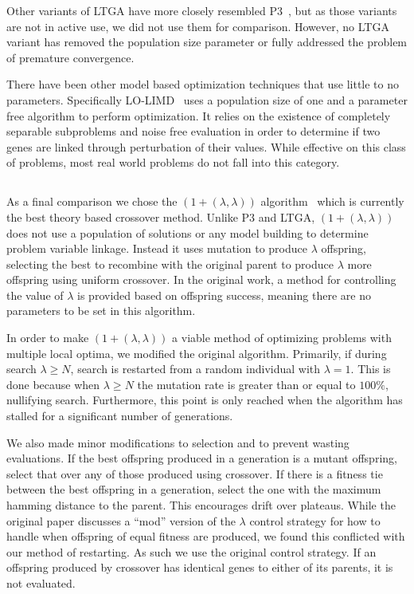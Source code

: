 \documentclass{sig-alternate}
\begin{document}
Other variants of LTGA have more closely resembled P3~\cite{goldman:2012:ltga},
but as those variants are not in active use, we did not use them for comparison.
However, no LTGA variant has removed the population size parameter
or fully addressed the problem of premature convergence.

There have been other model based optimization techniques that use little to
no parameters.  Specifically LO-LIMD~\cite{posik:2011:parameterless} uses a
population size of one and a parameter free algorithm to perform optimization.
It relies on the existence of completely separable subproblems and noise free evaluation in order to determine
if two genes are linked through perturbation of their values.  While effective on
this class of problems, most real world problems do not fall into this category.

\subsection{}
As a final comparison we chose the $(1+(\lambda,\lambda))$ algorithm~\cite{doerr:2013:lambdalambda}
which is currently the best theory based crossover method.  Unlike P3 and LTGA,
$(1+(\lambda,\lambda))$ does not use a population of solutions or any model building
to determine problem variable linkage.  Instead it uses mutation to produce $\lambda$
offspring, selecting the best to recombine with the original parent to produce $\lambda$
more offspring using uniform crossover.  In the original work, a method for controlling
the value of $\lambda$ is provided based on offspring success, meaning there are no
parameters to be set in this algorithm.

In order to make $(1+(\lambda,\lambda))$ a viable method of optimizing problems
with multiple local optima, we modified the original algorithm.  Primarily, if
during search $\lambda \ge N$, search is restarted from a random individual with
$\lambda=1$.  This is done because when $\lambda \ge N$ the mutation rate is greater
than or equal to $100\%$, nullifying search.  Furthermore, this point is only reached
when the algorithm has stalled for a significant number of generations.

We also made minor modifications to selection and to prevent wasting evaluations.
If the best offspring produced in a generation is a mutant offspring, select that
over any of those produced using crossover.  If there is a fitness tie between the
best offspring in a generation, select the one with the maximum hamming distance
to the parent.  This encourages drift over plateaus.  While the original paper
discusses a ``mod'' version of the $\lambda$ control strategy for how to handle
when offspring of equal fitness are produced, we found this conflicted with our
method of restarting.  As such we use the original control strategy. %
If an offspring produced by crossover has identical genes to either of its parents,
it is not evaluated.
\end{document}
